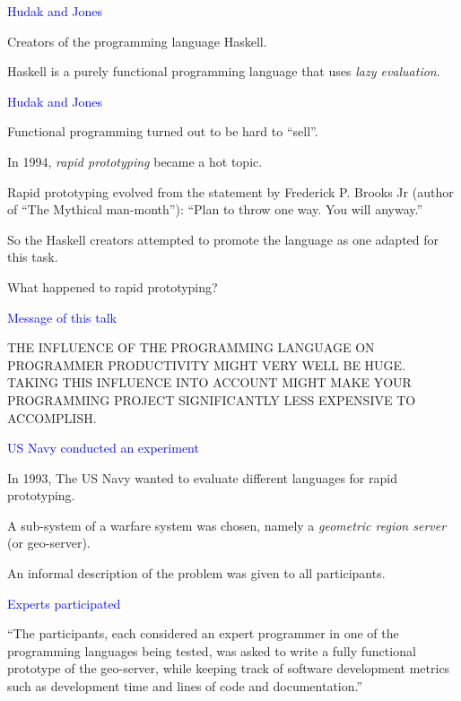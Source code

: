 \documentclass{slides}
\newcommand{\ti}[1]{\begin{center}\Large{\textcolor{blue}{#1}}\end{center}}
\begin{document}
\begin{slide}\ti{Hudak and Jones}

Creators of the programming language Haskell.

Haskell is a purely functional programming language that uses
\emph{lazy evaluation}.

\vfill\end{slide}
\begin{slide}\ti{Hudak and Jones}

Functional programming turned out to be hard to ``sell''.

In 1994, \emph{rapid prototyping} became a hot topic.

Rapid prototyping evolved from the statement by Frederick P. Brooks Jr
(author of ``The Mythical man-month''): ``Plan to throw one way.  You
will anyway.''

So the Haskell creators attempted to promote the language as one
adapted for this task.

What happened to rapid prototyping?

\vfill\end{slide}
\begin{slide}\ti{Message of this talk}

THE INFLUENCE OF THE PROGRAMMING LANGUAGE ON PROGRAMMER PRODUCTIVITY
MIGHT VERY WELL BE HUGE.  TAKING THIS INFLUENCE INTO ACCOUNT MIGHT
MAKE YOUR PROGRAMMING PROJECT SIGNIFICANTLY LESS EXPENSIVE TO
ACCOMPLISH.

\vfill\end{slide}
\begin{slide}\ti{US Navy conducted an experiment}

In 1993, The US Navy wanted to evaluate different languages for rapid
prototyping.

A sub-system of a warfare system was chosen, namely a \emph{geometric
  region server} (or geo-server).

An informal description of the problem was given to all participants.
\vfill\end{slide}
\begin{slide}\ti{Experts participated}

``The participants, each considered an expert programmer in one of the
  programming languages being tested, was asked to write a fully
  functional prototype of the geo-server, while keeping track of
  software development metrics such as development time and lines of
  code and documentation.''

\vfill\end{slide}
\end{document}
